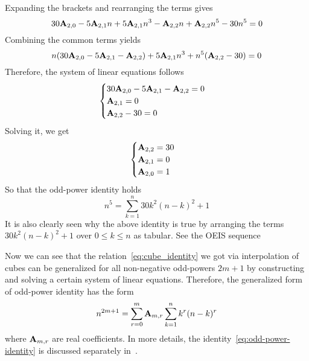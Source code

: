 Expanding the brackets and rearranging the terms gives
\begin{equation*}
    30 {\mathbf{A}} \sb{2,0} - 5 {\mathbf{A}} \sb{2,1} n + 5 {\mathbf{A}} \sb{2,1} n^3 - {\mathbf{A}} \sb{2,2} n + {\mathbf{A}} \sb{2,2} n^5 - 30n^5 = 0
\end{equation*}
Combining the common terms yields
\begin{equation*}
    n (30 {\mathbf{A}} \sb{2,0} - 5 {\mathbf{A}} \sb{2,1} - {\mathbf{A}} \sb{2,2}) + 5 {\mathbf{A}} \sb{2,1} n^3 + n^5 ({\mathbf{A}} \sb{2,2} - 30) = 0
\end{equation*}
Therefore, the system of linear equations follows
\begin{equation*}
    \begin{cases}
        30 {\mathbf{A}} \sb{2,0} - 5 {\mathbf{A}} \sb{2,1} - {\mathbf{A}} \sb{2,2} = 0 \\
        {\mathbf{A}} \sb{2,1} = 0 \\
        {\mathbf{A}} \sb{2,2} - 30 = 0
    \end{cases}
\end{equation*}
Solving it, we get
\begin{equation*}
    \begin{cases}
        {\mathbf{A}} \sb{2,2} = 30 \\
        {\mathbf{A}} \sb{2,1} = 0 \\
        {\mathbf{A}} \sb{2,0} = 1
    \end{cases}
\end{equation*}
So that the odd-power identity holds
\begin{equation*}
    n^5 = \sum_{k=1}^{n} 30k^2(n-k)^2 + 1
\end{equation*}
It is also clearly seen
why the above identity is true by arranging the terms $30k^2(n-k)^2 + 1$ over $0 \leq k \leq n$ as tabular.
See the OEIS sequence~\cite{kolosov2018fifth}


Now we can see that the relation~\eqref{eq:cube_identity}
we got via interpolation of cubes
can be generalized for all non-negative odd-powers $2m+1$ by constructing
and solving a certain system of linear equations.
Therefore, the generalized form of odd-power identity has the form
\begin{equation}
    n^{2m+1} = \sum_{r=0}^{m} {\mathbf{A}} \sb{m,r} \sum_{k=1}^{n} k^{r} (n-k)^{r}\label{eq:odd-power-identity}
\end{equation}
where ${\mathbf{A}} \sb{m,r}$ are real coefficients.
In more details, the identity~\eqref{eq:odd-power-identity} is discussed
separately in~\cite{kolosov2022106, kolosov2023polynomial}.

